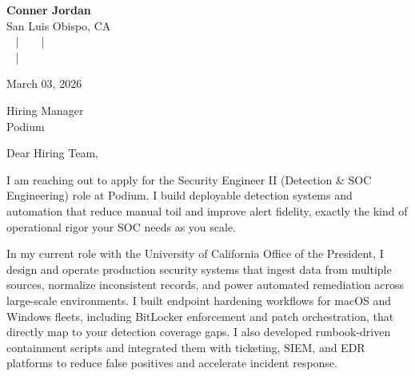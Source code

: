 \documentclass[letterpaper,11pt]{article}
\newcommand{\companyname}{Podium}
\begin{document}
\begin{center}
  {\Huge \textbf{Conner Jordan}}\\[4pt]
  {\Large San Luis Obispo, CA}\\[4pt]
  \href{tel:+18059759793}{
    } ~ | ~
  \href{mailto:connercharlesjordan@gmail.com}{
    } ~ | ~
   \\
  \href{https://www.linkedin.com/in/conner-jordan-4b268514a/}{
    } ~ | ~
  \href{https://github.com/cjordan223}{
    }
\end{center}

\vspace{16pt}

\begin{flushright}
March 03, 2026
\end{flushright}

Hiring Manager\\
\companyname

\vspace{26pt}

\noindent
Dear Hiring Team,

\vspace{16pt}

I am reaching out to apply for the Security Engineer II (Detection \& SOC Engineering) role at Podium. I build deployable detection systems and automation that reduce manual toil and improve alert fidelity, exactly the kind of operational rigor your SOC needs as you scale.

\vspace{16pt}

In my current role with the University of California Office of the President, I design and operate production security systems that ingest data from multiple sources, normalize inconsistent records, and power automated remediation across large-scale environments. I built endpoint hardening workflows for macOS and Windows fleets, including BitLocker enforcement and patch orchestration, that directly map to your detection coverage gaps. I also developed runbook-driven containment scripts and integrated them with ticketing, SIEM, and EDR platforms to reduce false positives and accelerate incident response.
\end{document}

